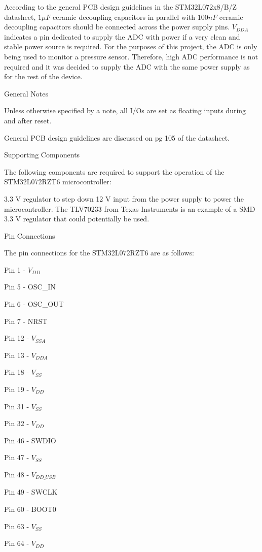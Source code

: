 According to the general PCB design guidelines in the STM32L072x8/B/Z datasheet, $1\mu F$ ceramic decoupling capacitors in parallel with $100 nF$ ceramic decoupling capacitors should be connected across the power supply pins. $V_{DDA}$ indicates a pin dedicated to supply the ADC with power if a very clean and stable power source is required. For the purposes of this project, the ADC is only being used to monitor a pressure sensor. Therefore, high ADC performance is not required and it was decided to supply the ADC with the same power supply as for the rest of the device.

General Notes

\begin{compactitem}
	\item Unless otherwise specified by a note, all I/Os are set as floating inputs during and after reset.
	\item General PCB design guidelines are discussed on pg 105 of the datasheet.
\end{compactitem}

Supporting Components

The following components are required to support the operation of the STM32L072RZT6 microcontroller:

\begin{compactitem}
	\item 3.3 V regulator to step down 12 V input from the power supply to power the microcontroller. The TLV70233 from Texas Instruments is an example of a SMD 3.3 V regulator that could potentially be used.
\end{compactitem}

Pin Connections

The pin connections for the STM32L072RZT6 are as follows:

\begin{compactitem}
	\item Pin 1 - $V_{DD}$
	\item Pin 5 - OSC\_IN
	\item Pin 6 - OSC\_OUT
	\item Pin 7 - NRST
	\item Pin 12 - $V_{SSA}$
	\item Pin 13 - $V_{DDA}$
	\item Pin 18 - $V_{SS}$
	\item Pin 19 - $V_{DD}$
	\item Pin 31 - $V_{SS}$
	\item Pin 32 - $V_{DD}$
	\item Pin 46 - SWDIO
	\item Pin 47 - $V_{SS}$
	\item Pin 48 - $V_{DD\_USB}$
	\item Pin 49 - SWCLK
	\item Pin 60 - BOOT0
	\item Pin 63 - $V_{SS}$
	\item Pin 64 - $V_{DD}$
\end{compactitem}

